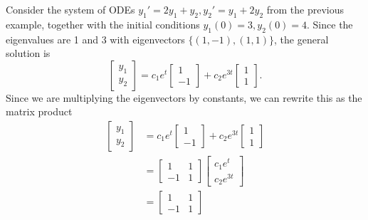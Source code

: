 \begin{example}
Consider the system of ODEs $y_1' = 2y_1+y_2, y_2'= y_1+2y_2$ from the previous example, together with the initial conditions $y_1(0)=3,y_2(0)=4$. 
Since the eigenvalues are 1 and 3 with eigenvectors $\{(1,-1),(1,1)\}$, the general solution is 
$$
\begin{bmatrix}y_1\\y_2\end{bmatrix} 
= c_1e^t\begin{bmatrix}1\\-1\end{bmatrix} 
+ c_2e^{3t}\begin{bmatrix}1\\1\end{bmatrix}. 
$$ 
Since we are multiplying the eigenvectors by constants, we can rewrite this as the matrix product 
\begin{align*}
\begin{bmatrix}y_1\\y_2\end{bmatrix} 
&= c_1e^t\begin{bmatrix}1\\-1\end{bmatrix} 
+ c_2e^{3t}\begin{bmatrix}1\\1\end{bmatrix} 
\\&=
\begin{bmatrix}1 &1\\-1&1\end{bmatrix}
\begin{bmatrix}c_1e^t\\c_2e^{3t}\end{bmatrix}
\\&=
\begin{bmatrix}1 &1\\-1&1\end{bmatrix}

\end{align*}
\end{example}
